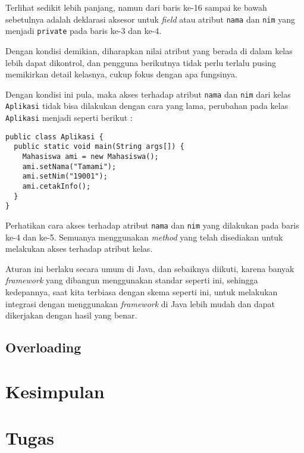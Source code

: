 Terlihat sedikit lebih panjang, namun dari baris ke-16 sampai ke bawah sebetulnya adalah deklarasi aksesor untuk \textit{field} atau atribut \texttt{nama} dan \texttt{nim} yang menjadi \texttt{private} pada baris ke-3 dan ke-4.

Dengan kondisi demikian, diharapkan nilai atribut yang berada di dalam kelas lebih dapat dikontrol, dan pengguna berikutnya tidak perlu terlalu pusing memikirkan detail kelasnya, cukup fokus dengan apa fungsinya.

Dengan kondisi ini pula, maka akses terhadap atribut \texttt{nama} dan \texttt{nim} dari kelas \texttt{Aplikasi} tidak bisa dilakukan dengan cara yang lama, perubahan pada kelas \texttt{Aplikasi} menjadi seperti berikut :

\begin{lstlisting}
public class Aplikasi {
  public static void main(String args[]) {
    Mahasiswa ami = new Mahasiswa();
    ami.setNama("Tamami");
    ami.setNim("19001");
    ami.cetakInfo();
  }
}
\end{lstlisting}

Perhatikan cara akses terhadap atribut \texttt{nama} dan \texttt{nim} yang dilakukan pada baris ke-4 dan ke-5. Semuanya menggunakan \textit{method} yang telah disediakan untuk melakukan akses terhadap atribut kelas.

Aturan ini berlaku secara umum di Java, dan sebaiknya diikuti, karena banyak \textit{framework} yang dibangun menggunakan standar seperti ini, sehingga kedepannya, saat kita terbiasa dengan skema seperti ini, untuk melakukan integrasi dengan menggunakan \textit{framework} di Java lebih mudah dan dapat dikerjakan dengan hasil yang benar.

\subsection{Overloading}

\section{Kesimpulan}

\section{Tugas}